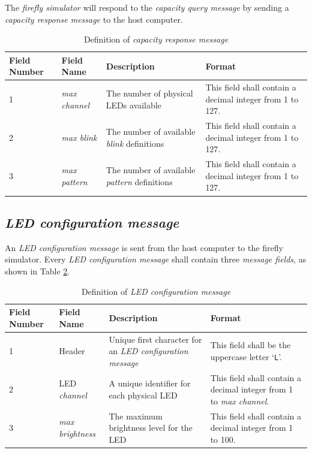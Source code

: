 \documentclass[letterpaper,11pt]{article}
\begin{document}
The \textit{firefly simulator} will respond to the \textit{capacity query
message} by sending a \textit{capacity response message} to the host computer.

\begin{table}[H]
  \caption{Definition of \textit{capacity response message}}
  \centering
  \setlength\extrarowheight{2pt}
  \begin{tabular}[h]{|p{0.5in}|p{1.00in}|p{2.25in}|p{2.25in}|} \hline
    Field Number & Field Name & Description & Format \\ \hline
    1            & \textit{max channel}
    & The number of physical LEDs available
    & This field shall contain a decimal integer from 1 to 127.
    \\ \hline
    2            & \textit{max blink}
    & The number of available \textit{blink} definitions
    & This field shall contain a decimal integer from 1 to 127.
    \\ \hline
    3            & \textit{max pattern}
    & The number of available \textit{pattern} definitions
    & This field shall contain a decimal integer from 1 to 127.
    \\ \hline
  \end{tabular}
  \label{tab:CapacityResponse}
\end{table}

\subsection{\textit{LED configuration message}}

An \textit{LED configuration message} is sent from the host computer to the
firefly simulator. Every \textit{LED configuration message} shall contain
three \textit{message fields}, as shown in Table \ref{tab:LEDconfig}.

\begin{table}[H]
  \caption{Definition of \textit{LED configuration message}}
  \centering
  \setlength\extrarowheight{2pt}
  \begin{tabular}[h]{|p{0.5in}|p{1.00in}|p{2.25in}|p{2.25in}|} \hline
    Field Number & Field Name & Description & Format \\ \hline
    1            & Header
    & Unique first character for an \textit{LED configuration message}
    & This field shall be the uppercase letter `\texttt{L}'.
    \\ \hline
    2            & LED \textit{channel}
    & A unique identifier for each physical LED
    & This field shall contain a decimal integer from 1 to \textit{max channel}.
    \\ \hline
    3            & \textit{max brightness}
    & The maximum brightness level for the LED
    & This field shall contain a decimal integer from 1 to 100.
    \\ \hline
  \end{tabular}
  \label{tab:LEDconfig}
\end{table}
\end{document}
